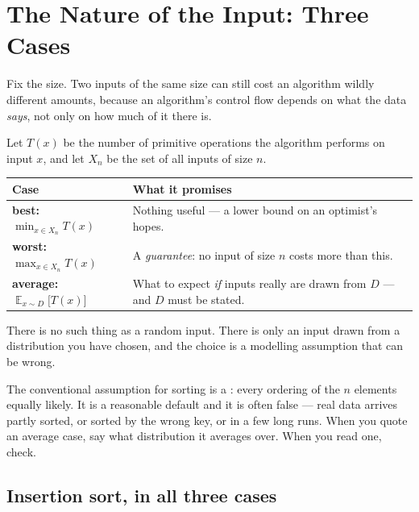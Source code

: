 \section{The Nature of the Input: Three Cases}

Fix the size. Two inputs of the same size can still cost an algorithm wildly
different amounts, because an algorithm's control flow depends on what the data
\emph{says}, not only on how much of it there is.

\begin{definitionbox}
Let $T(x)$ be the number of primitive operations the algorithm performs on
input $x$, and let $X_{n}$ be the set of all inputs of size $n$.

\medskip
{}
\begin{longtable}{@{}L{4.6cm}L{9.9cm}@{}}
\toprule
{}
\textbf{Case} & \textbf{What it promises} \\
\midrule
\endhead
\textbf{best:}\quad $\displaystyle\min_{x \in X_{n}} T(x)$
  & Nothing useful --- a lower bound on an optimist's hopes. \\
\textbf{worst:}\quad $\displaystyle\max_{x \in X_{n}} T(x)$
  & A \emph{guarantee}: no input of size $n$ costs more than this. \\
\textbf{average:}\quad $\displaystyle\mathop{\mathbb{E}}_{x \sim D}
  \bigl[T(x)\bigr]$
  & What to expect \emph{if} inputs really are drawn from $D$ --- and $D$ must
    be stated. \\
\bottomrule
\end{longtable}
\end{definitionbox}

\begin{alertbox}
There is no such thing as a random input. There is only an input drawn from a
distribution you have chosen, and the choice is a modelling assumption that can
be wrong.

\smallskip
The conventional assumption for sorting is a : every ordering of the $n$ elements equally likely. It is a
reasonable default and it is often false --- real data arrives partly sorted,
or sorted by the wrong key, or in a few long runs. When you quote an average
case, say what distribution it averages over. When you read one, check.
\end{alertbox}

\subsection*{Insertion sort, in all three cases}

